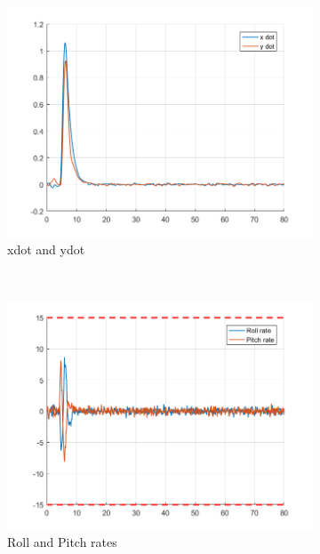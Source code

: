 \documentclass[11pt]{article}
\begin{document}
\begin{enumerate}
\begin{figure}[ht]
        \begin{subfigure}[c]{0.3\linewidth}
            \centering
            \includegraphics[width=\linewidth]{Plots_11_NonlinearModel_StepSignal/07}
            \caption{xdot and ydot}
        \end{subfigure}
        ~
        \begin{subfigure}[c]{0.3\linewidth}
            \centering
            \includegraphics[width=\linewidth]{Plots_11_NonlinearModel_StepSignal/08}
            \caption{Roll and Pitch rates}
        \end{subfigure}
        ~
        \begin{subfigure}[c]{0.3\linewidth}
            \centering

\end{subfigure}
\end{figure}
\end{enumerate}
\end{document}
